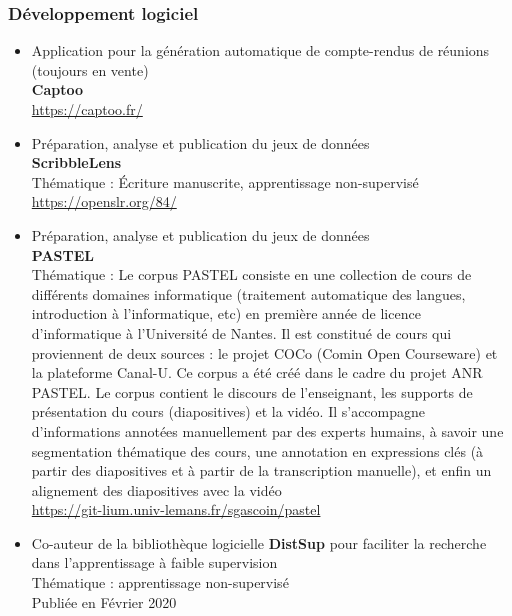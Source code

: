 \documentclass[11pt,a4paper]{article}
\begin{document}
\subsubsection{Développement logiciel}
\begin{itemize}
\item Application pour la génération automatique de compte-rendus de réunions (toujours en vente) \\
{\bf Captoo} \\
\href{https://captoo.fr/}{https://captoo.fr/}

\item Préparation, analyse et publication du jeux de données \\
{\bf ScribbleLens} \\
Thématique : Écriture manuscrite, apprentissage non-supervisé \\
\href{https://openslr.org/84/}{https://openslr.org/84/}
\item Préparation, analyse et publication du jeux de données \\
{\bf PASTEL} \\
Thématique : Le corpus PASTEL consiste en une collection de cours de différents domaines informatique (traitement automatique des langues, introduction à l’informatique, etc) en première année de licence d’informatique à l’Université de Nantes. Il est constitué de cours qui proviennent de deux sources : le projet COCo (Comin Open Courseware) et la plateforme Canal-U. Ce corpus a été créé dans le cadre du projet ANR PASTEL. Le corpus contient le discours de l’enseignant, les supports de présentation du cours (diapositives) et la vidéo. Il s’accompagne d’informations annotées manuellement par des experts humains, à savoir une segmentation thématique des cours, une annotation en expressions clés (à partir des diapositives et à partir de la transcription manuelle), et enfin un alignement des diapositives avec la vidéo \cite{mdhaffar2020} \\
\href{https://git-lium.univ-lemans.fr/sgascoin/pastel}{https://git-lium.univ-lemans.fr/sgascoin/pastel}
\item Co-auteur de la bibliothèque logicielle 
{\bf DistSup} pour faciliter la recherche dans l'apprentissage à faible supervision\\
Thématique : apprentissage non-supervisé \\
Publiée en Février 2020\\

\end{itemize}
\end{document}
